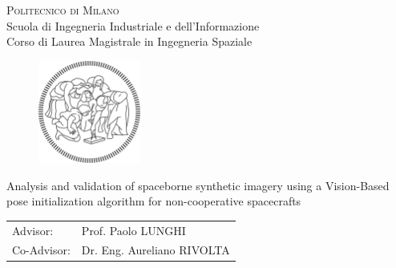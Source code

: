 \begin{titlepage}

\begin{center}
\Large{\textsc{Politecnico di Milano}}\\
\Large{Scuola di Ingegneria Industriale e dell'Informazione}\\
\large{Corso di Laurea Magistrale in Ingegneria Spaziale}\\
\par
\par
\end{center}

\vspace{0.5cm}

\begin{center}
\begin{figure}[h!]
\centering{}
\includegraphics[width=0.3\textwidth]{title-page/logo-polimi-new}
\end{figure}
\vspace{1cm}
\par
\end{center}

\begin{center}
\LARGE{Analysis and validation of spaceborne synthetic imagery using a Vision-Based pose initialization algorithm for non-cooperative spacecrafts}
\vspace{2cm}
\par
\end{center}

\begin{flushleft}
\begin{tabular}{ll}
Advisor:  & Prof. Paolo LUNGHI\tabularnewline
Co-Advisor:  & Dr. Eng. Aureliano RIVOLTA\tabularnewline %
\end{tabular}\vspace{1cm}
\par
\end{flushleft}


\end{titlepage}
